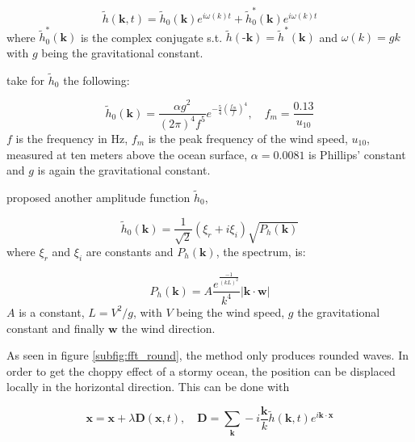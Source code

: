 \begin{equation}
    \tilde{h}(\textbf{k}, t) = \tilde{h}_0(\textbf{k}) e^{i\omega(k)t} +
    \tilde{h}_0^*(\textbf{k}) e^{i\omega(k)t}
\end{equation}
%
where $\tilde{h}_0^*(\textbf{k})$ is the complex conjugate s.t.
$\tilde{h}(\textbf{-k})=\tilde{h}^*(\textbf{k})$ and $\omega(k)=gk$ with $g$
being the gravitational constant.

\citeauthor{mastin1987fourier} take for $\tilde{h}_0$ the following:

\begin{equation}
    \tilde{h}_0(\textbf{k}) = \frac{\alpha g^2}{{(2\pi)}^4 f^5}
    e^{-\frac{5}{4}{(\frac{f_m}{f})}^4}, \quad f_m=\frac{0.13}{u_{10}}
\end{equation}
%
$f$ is the frequency in Hz, $f_m$ is the peak frequency of the wind speed,
$u_{10}$, measured at ten meters above the ocean surface, $\alpha=0.0081$ is
Phillips' constant and $g$ is again the gravitational constant.

\citeauthor{tessendorf2001simulating} proposed another amplitude function
$\tilde{h}_0$, 

\begin{equation}\label{eq:tessendorf_h0}
    \tilde{h}_0(\textbf{k}) = \frac{1}{\sqrt{2}}(\xi_r +
    i\xi_i)\sqrt{P_h(\textbf{k})}
\end{equation}
%
where $\xi_r$ and $\xi_i$ are constants and $P_h(\textbf{k})$, the spectrum, is:

\begin{equation}
    P_h(\textbf{k}) = A\frac{e^{\frac{-1}{{(kL)}^2}}}{k^4}
    |\textbf{k}\cdot\textbf{w}|
\end{equation}
%
$A$ is a constant, $L=V^2/g$, with $V$ being the wind speed, $g$ the
gravitational constant and finally $\textbf{w}$ the wind direction.

As seen in figure \autoref{subfig:fft_round}, the method only produces rounded
waves. In order to get the choppy effect of a stormy ocean, the position can be
displaced locally in the horizontal direction. This can be done with

\begin{equation}
    \textbf{x} = \textbf{x} + \lambda \textbf{D}(\textbf{x}, t), \quad
    \textbf{D} = \sum_{\textbf{k}}^{} -i\frac{\textbf{k}}{k}
    \tilde{h}(\textbf{k},t) e^{i\textbf{k}\cdot\textbf{x}}
\end{equation}

